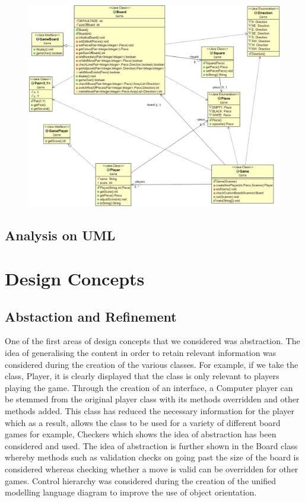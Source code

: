\documentclass[a4wide, 11pt]{article}
\begin{document}
\begin{figure}[htb]
\includegraphics{umlDiagram.png}
\end{figure}

\subsection{Analysis on UML}

\section{Design Concepts}
\subsection{Abstaction and Refinement}
One of the first areas of design concepts that we considered was abstraction. The idea of generalising the content in order to retain relevant information was considered during the creation of the various classes. For example, if we take the class, Player, it is clearly displayed that the class is only relevant to players playing the game. Through the creation of an interface, a Computer player can be stemmed from the original player class with its methods overridden and other methods added. This class has reduced the necessary information for the player which as a result, allows the class to be used for a variety of different board games for example, Checkers which shows the idea of abstraction has been considered and used.  The idea of abstraction is further shown in the Board class whereby methods such as validation checks on going past the size of the board is considered whereas checking whether a move is valid can be overridden for other games. Control hierarchy was considered during the creation of the unified modelling language diagram to improve the use of object orientation.
\end{document}
